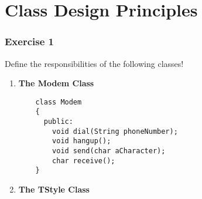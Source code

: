 \documentclass[14pt]{article}
\begin{document}
\part*{Class Design Principles}
\label{part:all}


\section*{Exercise 1}
\large
Define the responsibilities of the following classes!\\
 \begin{enumerate}
\item \large \textbf{The Modem Class}\\
  \normalsize
  \begin{lstlisting}
    class Modem
    {
      public:
        void dial(String phoneNumber);
        void hangup();
        void send(char aCharacter);
        char receive();
    }
  \end{lstlisting}
\item \large \textbf{The TStyle Class}\\
  \normalsize
  
\end{enumerate}
\end{document}
